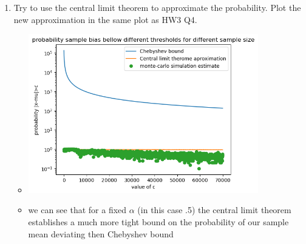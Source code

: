 \documentclass[12pt,twoside]{article}
\begin{document}
\begin{enumerate}
\begin{enumerate}
    \item  Try to use the central limit theorem to approximate the probability. Plot the new approximation in the same plot as HW3 Q4.
    \begin{itemize}
        \color{blue}
        \item 
        \includegraphics[width=10cm]{homework/homework_3/immages/hw_4_1.png}
        \item we can see that for a fixed $\alpha$ (in this case .5) the central limit theorem establishes a much more tight bound on the probability of our sample mean deviating then Chebyshev bound 
    \end{itemize}


\end{enumerate}
\end{enumerate}
\end{document}
